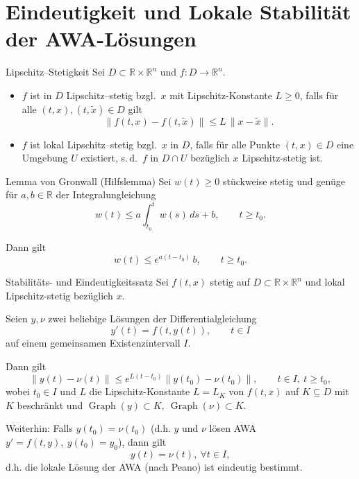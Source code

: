 \newpage
\section{Eindeutigkeit und Lokale Stabilität der AWA-Lösungen}
\label{5.3}

\begin{definition}{Lipschitz--Stetigkeit}
    Sei $D\subset\mathbb{R}\times\mathbb{R}^n$ und $f\colon D\to\mathbb{R}^n$.

    \begin{itemize}
    \item $f$ ist in $D$ Lipschitz--stetig bzgl.\ $x$ mit Lipschitz-Konstante $L\ge 0$, falls für alle $(t,x),(t,\tilde{x})\in D$ gilt
    $$
    \lVert f(t,x)-f(t,\tilde{x})\rVert \le L\,\lVert x-\tilde{x}\rVert.
    $$

    \item $f$ ist lokal Lipschitz--stetig bzgl.\ $x$ in $D$, falls für alle Punkte $(t,x)\in D$ eine Umgebung $U$ existiert, s.\,d.\ $f$ in $D\cap U$ bezüglich $x$ Lipschitz-stetig ist.
    \end{itemize}   
\end{definition}

\begin{lemma}{Lemma von Gronwall (Hilfslemma)}
    Sei $w(t)\ge 0$ stückweise stetig und genüge für $a,b\in\mathbb{R}$ der Integralungleichung
    $$
    w(t)\le a\int_{t_0}^{t} w(s)\,ds + b,\qquad t\ge t_0.
    $$

    Dann gilt
    $$
    w(t)\le e^{a(t-t_0)}\,b,\qquad t\ge t_0.
    $$   
\end{lemma}

\begin{satz}{Stabilitäts- und Eindeutigkeitssatz}
    Sei $f(t,x)$ stetig auf $D\subset\mathbb{R}\times\mathbb{R}^n$ und lokal Lipschitz-stetig bezüglich $x$.
    \vspace{1em}

    Seien $y,\nu$ zwei beliebige Lösungen der Differentialgleichung
    $$
    y'(t)=f(t,y(t)),\qquad t\in I
    $$
    auf einem gemeinsamen Existenzintervall $I$.

    Dann gilt
    $$
    \|y(t)-\nu(t)\|\le e^{L(t-t_0)}\|y(t_0)-\nu(t_0)\|,\qquad t\in I,\ t\ge t_0,
    $$
    wobei $t_0\in I$ und $L$ die Lipschitz-Konstante $L=L_K$ von $f(t,x)$ auf $K\subseteq D$ mit $K$ beschränkt und $\operatorname{Graph}(y)\subset K,\ \operatorname{Graph}(\nu)\subset K$.
    \vspace{1em}

    Weiterhin: Falls $y(t_0)=\nu(t_0)$ (d.h. $y$ und $\nu$ lösen AWA $y'=f(t,y),\ y(t_0)=y_0$), dann gilt
    $$
    y(t)=\nu(t),\ \forall t\in I,
    $$
    d.h. die lokale Lösung der AWA (nach Peano) ist eindeutig bestimmt.   
\end{satz}


